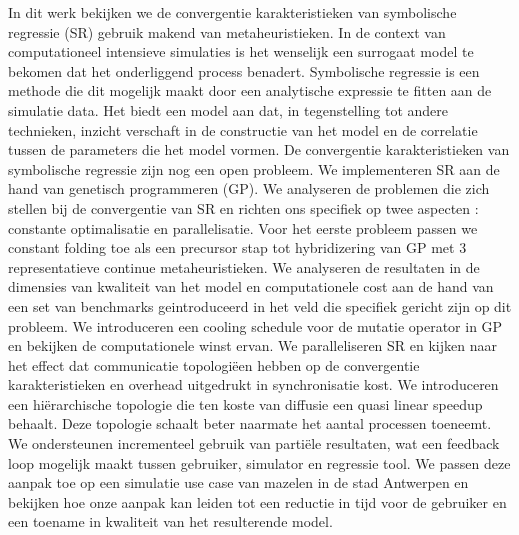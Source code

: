In dit werk bekijken we de convergentie karakteristieken van symbolische regressie (SR) gebruik makend van metaheuristieken. In de context van computationeel intensieve simulaties is het wenselijk een surrogaat model te bekomen dat het onderliggend process benadert. Symbolische regressie is een methode die dit mogelijk maakt door een analytische expressie te fitten aan de simulatie data. Het biedt een model aan dat, in tegenstelling tot andere technieken, inzicht verschaft in de constructie van het model en de correlatie tussen de parameters die het model vormen. De convergentie karakteristieken van symbolische regressie zijn nog een open probleem.
We implementeren SR aan de hand van genetisch programmeren (GP). We analyseren de problemen die zich stellen bij de convergentie van SR en richten ons specifiek op twee aspecten : constante optimalisatie en parallelisatie. Voor het eerste probleem passen we constant folding toe als een precursor stap tot hybridizering van GP met 3 representatieve continue metaheuristieken. We analyseren de resultaten in de dimensies van kwaliteit van het model en computationele cost aan de hand van een set van benchmarks geintroduceerd in het veld die specifiek gericht zijn op dit probleem. We introduceren een cooling schedule voor de mutatie operator in GP en bekijken de computationele winst ervan. 
We paralleliseren SR en kijken naar het effect dat communicatie topologiëen hebben op de convergentie karakteristieken en overhead uitgedrukt in synchronisatie kost. 
We introduceren een hiërarchische topologie die ten koste van diffusie een quasi linear speedup behaalt. Deze topologie schaalt beter naarmate het aantal processen toeneemt. We ondersteunen incrementeel gebruik van partiële resultaten, wat een feedback loop mogelijk maakt tussen gebruiker, simulator en regressie tool. We passen deze aanpak toe op een simulatie use case van mazelen in de stad Antwerpen en bekijken hoe onze aanpak kan leiden tot een reductie in tijd voor de gebruiker en een toename in kwaliteit van het resulterende model.